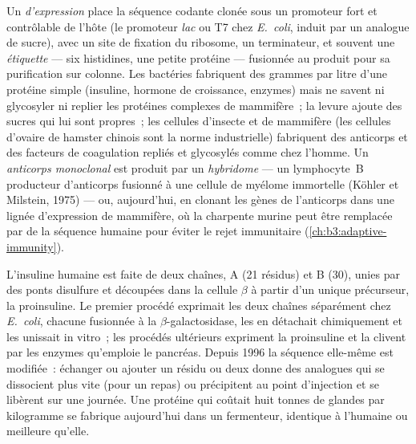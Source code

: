 \begin{definition}\label{def:b3:genetic-engineering:expression}
Un \emph{ d'expression} place la séquence codante clonée sous un
promoteur fort et contrôlable de l'hôte (le promoteur \emph{lac} ou T7
chez \emph{E.~coli}, induit par un analogue de sucre), avec un site de
fixation du ribosome, un terminateur, et souvent une \emph{étiquette}
--- six histidines, une petite protéine --- fusionnée au produit pour
sa purification sur colonne. Les bactéries fabriquent des grammes par
litre d'une protéine simple (insuline, hormone de croissance, enzymes)
mais ne savent ni glycosyler ni replier les protéines complexes de
mammifère~; la levure ajoute des sucres qui lui sont propres~; les
cellules d'insecte et de mammifère (les cellules d'ovaire de hamster
chinois sont la norme industrielle) fabriquent des anticorps et des
facteurs de coagulation repliés et glycosylés comme chez l'homme. Un
\emph{anticorps monoclonal} est produit par un \emph{hybridome} --- un
lymphocyte~B producteur d'anticorps fusionné à une cellule de myélome
immortelle (Köhler et Milstein, 1975) --- ou, aujourd'hui, en clonant
les gènes de l'anticorps dans une lignée d'expression de mammifère, où
la charpente murine peut être remplacée par de la séquence humaine pour
éviter le rejet immunitaire (\cref{ch:b3:adaptive-immunity}).
\end{definition}

\begin{example}[L'insuline]\label{ex:b3:genetic-engineering:insulin}
L'insuline humaine est faite de deux chaînes, A (21 résidus) et B
(30), unies par des ponts disulfure et découpées dans la cellule
$\beta$ à partir d'un unique précurseur, la proinsuline. Le premier
procédé exprimait les deux chaînes séparément chez \emph{E.~coli},
chacune fusionnée à la $\beta$-galactosidase, les en détachait
chimiquement et les unissait in vitro~; les procédés ultérieurs
expriment la proinsuline et la clivent par les enzymes qu'emploie le
pancréas. Depuis 1996 la séquence elle-même est modifiée~: échanger ou
ajouter un résidu ou deux donne des analogues qui se dissocient plus
vite (pour un repas) ou précipitent au point d'injection et se libèrent
sur une journée. Une protéine qui coûtait huit tonnes de glandes par
kilogramme se fabrique aujourd'hui dans un fermenteur, identique à
l'humaine ou meilleure qu'elle.
\end{example}

